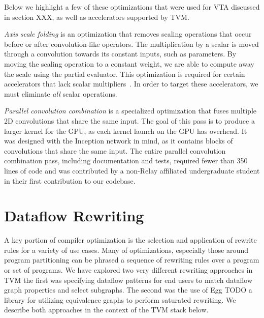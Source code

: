 Below we highlight a few of these optimizations that were used for
VTA discussed in section XXX, as well as accelerators supported by
TVM.

\textit{Axis scale folding} is an optimization that removes scaling
  operations that occur before or after convolution-like operators.
The multiplication by a scalar is moved through a convolution towards
  its constant inputs, such as parameters.
By moving the scaling operation to a constant weight, we are able
  to compute away the scale using the partial evaluator.
This optimization is required for certain accelerators that lack scalar multipliers~\citep{moreau2018vta}.
In order to target these accelerators,
  we must eliminate \textit{all} scalar operations.

\textit{Parallel convolution combination} is a specialized
  optimization that fuses multiple 2D convolutions that share the same input.
The goal of this pass is to produce a larger kernel for the GPU,
  as each kernel launch on the GPU has overhead.
It was designed with the Inception network \citep{inception} in mind, as it
  contains blocks of convolutions that share the same input.
The entire parallel convolution combination pass,
  including documentation and tests,
  required fewer than 350 lines of code and was contributed
  by a non-Relay affiliated undergraduate student
  in their first contribution to our codebase.

\section{Dataflow Rewriting}

A key portion of compiler optimization is
  the selection and application of rewrite rules for a variety
  of use cases.
Many of optimizations, especially those around program partitioning can
  be phrased a sequence of rewriting rules over a program or set of
  programs.
We have explored two very different rewriting approaches in TVM
  the first was specifying dataflow patterns for end users to
  match dataflow graph properties and select subgraphs.
The second was the use of Egg TODO a library
  for utilizing equivalence graphs to perform saturated rewriting.
We describe both approaches in the context of the TVM stack
  below.


